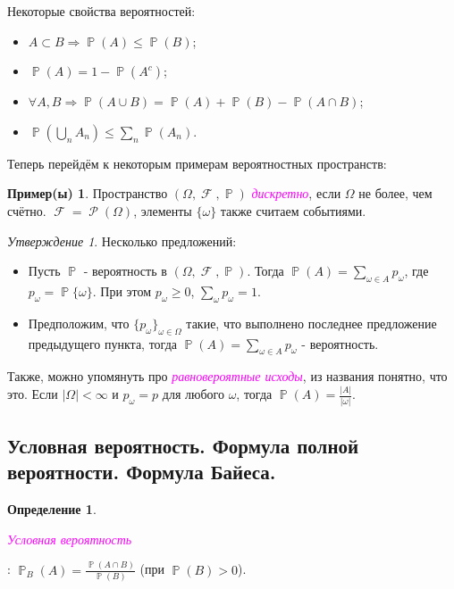 \documentclass[a4paper,100pt]{article}
\theoremstyle{indented}
\theoremstyle{definition}
\newtheorem{defn}{Определение}
\newtheorem{exl}{Пример(ы)}
\theoremstyle{remark}
\newtheorem{stat}{Утверждение}
\DeclareMathOperator{\PP}{\mathbb{P}}
\DeclareMathOperator{\FF}{\mathcal{F}}
\DeclareMathOperator{\Rho}{\mathcal{P}}
\begin{document}
Некоторые свойства вероятностей:

\begin{itemize}
  \item $A\subset B \Rightarrow \PP(A)\leq \PP(B)$;
  \item $\PP(A)=1-\PP(A^c)$;
  \item $\forall A, B \Rightarrow \PP(A\cup B)=\PP(A)+\PP(B)-\PP(A\cap B)$;
  \item $\PP(\bigcup_n A_n)\leq \sum_n \PP(A_n)$.
\end{itemize}

Теперь перейдём к некоторым примерам вероятностных пространств:

\begin{exl}

  Пространство $(\Omega, \FF, \PP)$ \hypertarget{n2}{\textcolor{magenta}{\textit{дискретно}}}, если $\Omega$ не более, чем счётно. $\FF=\Rho(\Omega)$, элементы $\{\omega\}$ также считаем событиями.
  \begin{stat}
      Несколько предложений:

      \begin{itemize}
          \item Пусть $\PP$ - вероятность в $(\Omega, \FF, \PP)$. Тогда $\PP(A)=\sum_{\omega\in A}p_\omega$, где $p_\omega=\PP\{\omega\}$. При этом $p_\omega\geq 0$, $\sum_\omega p_\omega = 1$. 
          \item Предположим, что $\{p_\omega\}_{\omega\in\Omega}$ такие, что выполнено последнее предложение предыдущего пункта, тогда $\PP(A)=\sum_{\omega\in A}p_\omega$ - вероятность.
      \end{itemize}
  \end{stat}
\end{exl}

Также, можно упомянуть про \hypertarget{n3}{\textcolor{magenta}{\textit{равновероятные исходы}}}, из названия понятно, что это. Если $\vert \Omega\vert <\infty$ и $p_\omega=p$ для любого $\omega$, тогда $\PP(A)=\frac{\vert A\vert}{\vert \omega \vert}$. \ 



\subsection{Условная вероятность. Формула полной вероятности. Формула Байеса.} 



\begin{defn}
  \hypertarget{n4}{\textcolor{magenta}{\textit{Условная вероятность}}}: $\PP_B(A)=\frac{\PP(A\cap B)}{\PP(B)}$ (при $\PP(B)>0$).
\end{defn}
\end{document}
